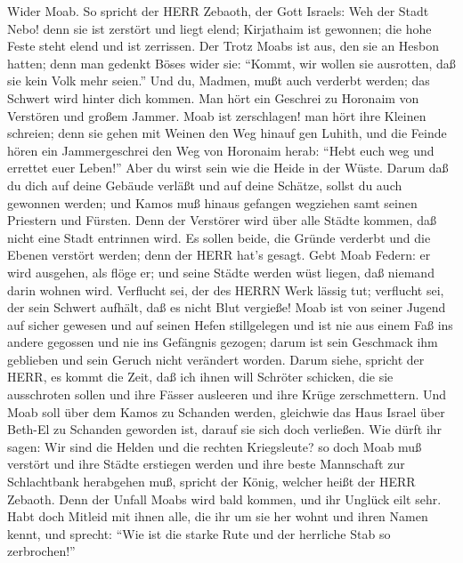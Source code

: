  Wider Moab. So spricht der HERR Zebaoth, der Gott Israels:
Weh der Stadt Nebo! denn sie ist zerstört und liegt elend; Kirjathaim
ist gewonnen; die hohe Feste steht elend und ist zerrissen. 
Der Trotz Moabs ist aus, den sie an Hesbon hatten; denn man gedenkt
Böses wider sie: ``Kommt, wir wollen sie ausrotten, daß sie kein Volk
mehr seien.'' Und du, Madmen, mußt auch verderbt werden; das Schwert
wird hinter dich kommen.  Man hört ein Geschrei zu Horonaim
von Verstören und großem Jammer.  Moab ist zerschlagen! man
hört ihre Kleinen schreien;  denn sie gehen mit Weinen den
Weg hinauf gen Luhith, und die Feinde hören ein Jammergeschrei den Weg
von Horonaim herab:  ``Hebt euch weg und errettet euer
Leben!'' Aber du wirst sein wie die Heide in der Wüste. 
Darum daß du dich auf deine Gebäude verläßt und auf deine Schätze,
sollst du auch gewonnen werden; und Kamos muß hinaus gefangen wegziehen
samt seinen Priestern und Fürsten.  Denn der Verstörer wird
über alle Städte kommen, daß nicht eine Stadt entrinnen wird. Es sollen
beide, die Gründe verderbt und die Ebenen verstört werden; denn der HERR
hat's gesagt.  Gebt Moab Federn: er wird ausgehen, als flöge
er; und seine Städte werden wüst liegen, daß niemand darin wohnen wird.
 Verflucht sei, der des HERRN Werk lässig tut; verflucht
sei, der sein Schwert aufhält, daß es nicht Blut vergieße! 
Moab ist von seiner Jugend auf sicher gewesen und auf seinen Hefen
stillgelegen und ist nie aus einem Faß ins andere gegossen und nie ins
Gefängnis gezogen; darum ist sein Geschmack ihm geblieben und sein
Geruch nicht verändert worden.  Darum siehe, spricht der
HERR, es kommt die Zeit, daß ich ihnen will Schröter schicken, die sie
ausschroten sollen und ihre Fässer ausleeren und ihre Krüge
zerschmettern.  Und Moab soll über dem Kamos zu Schanden
werden, gleichwie das Haus Israel über Beth-El zu Schanden geworden ist,
darauf sie sich doch verließen.  Wie dürft ihr sagen: Wir
sind die Helden und die rechten Kriegsleute?  so doch Moab
muß verstört und ihre Städte erstiegen werden und ihre beste Mannschaft
zur Schlachtbank herabgehen muß, spricht der König, welcher heißt der
HERR Zebaoth.  Denn der Unfall Moabs wird bald kommen, und
ihr Unglück eilt sehr.  Habt doch Mitleid mit ihnen alle,
die ihr um sie her wohnt und ihren Namen kennt, und sprecht: ``Wie ist
die starke Rute und der herrliche Stab so zerbrochen!'' 
